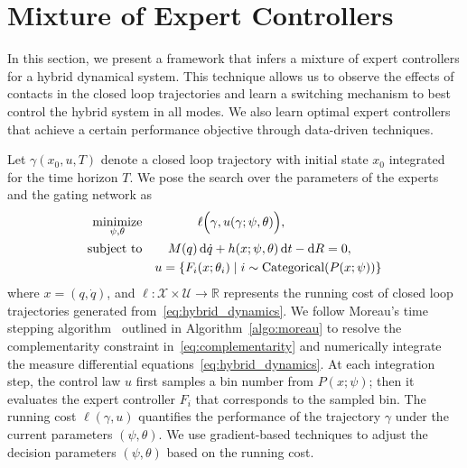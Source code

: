 \section{Mixture of Expert Controllers}
\label{sec:moe_methods}

In this section, we present a framework that infers a mixture of expert
controllers for a hybrid dynamical system. 
%
This technique allows us to observe the effects of contacts in the closed loop
trajectories  and learn a switching mechanism to best control the hybrid system
in all modes.
%
We also learn optimal expert controllers that achieve a certain performance
objective through data-driven techniques.


%
Let $\gamma(x_0, u, T)$ denote a closed loop trajectory with initial state $x_0$
integrated for the time horizon $T$.
%
We pose the search over the parameters of the experts and the gating network as
\begin{equation}
    \begin{aligned}
        \underset{\psi, \theta}{\textrm{minimize}} 
        & & & \ell \Bigl(\gamma,u(\gamma; \psi, \theta) \Bigr)  , \\%
        \textrm{subject to}
        & & M(q) &\dd \dot{q} + h(x; \psi, \theta)\dd t - \dd R  = 0,\\%
        & & u = \{F_i&(x; \theta_i) \; | \; i  \sim \text{Categorical} (P(x; \psi)) \}
    \end{aligned}
    \label{eq:moe_opt}
\end{equation}
\noindent where $x = (q, \dot{q})$, and $\ell : \mathcal{X} \times \mathcal{U}
\rightarrow \mathbb{R}$ represents the running cost of closed loop trajectories
generated from~\eqref{eq:hybrid_dynamics}.
%
We follow Moreau's time stepping algorithm~\cite{glocker2005formulation} outlined
in Algorithm~\eqref{algo:moreau} to resolve the complementarity constraint
in~\eqref{eq:complementarity} and numerically integrate the measure differential
equations~\eqref{eq:hybrid_dynamics}.
%
At each integration step, the control law $u$ first samples a bin number from
$P(x;\psi)$; then it evaluates the expert controller $F_i$ that corresponds to
the sampled bin.
%
The running cost $\ell(\gamma, u)$ quantifies the performance of the trajectory
$\gamma$ under the current parameters $(\psi, \theta)$.
%
We use gradient-based techniques to adjust the decision parameters $(\psi, \theta)$
based on the running cost.

